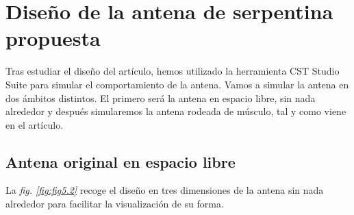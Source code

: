 
\begin{table}[h]
    \centering{}
    \caption{Materiales originales de la antena de serpentina del artículo de Soontornpipit.}
    \label{tab:tabla5.2}
\end{table}


\section{Diseño de la antena de serpentina propuesta}\label{sec:original}

Tras estudiar el diseño del artículo, hemos utilizado la herramienta CST Studio Suite para simular el comportamiento de la antena. Vamos a simular la antena en dos ámbitos distintos. El primero será la antena en espacio libre, sin nada alrededor y después simularemos la antena rodeada de músculo, tal y como viene en el artículo.

\subsection{Antena original en espacio libre}\label{subsec:antena-original-en-espacio-libre}

La \textit{fig. \ref{fig:fig5.2}} recoge el diseño en tres dimensiones de la antena sin nada alrededor para facilitar la visualización de su forma.

